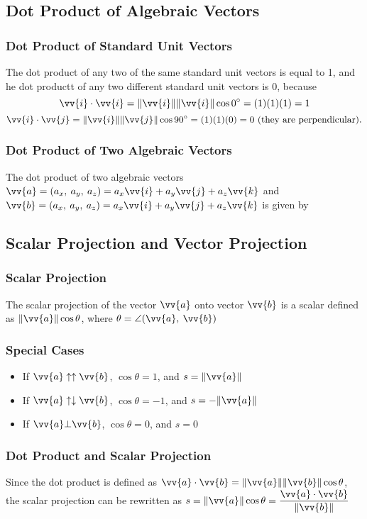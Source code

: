 \documentclass{article}
\newcommand{\mv}[1]{
	\lVert\vv{#1}\rVert
}
\begin{document}
	\subsection{Dot Product of Algebraic Vectors}
	\subsubsection{Dot Product of Standard Unit Vectors}
	The dot product of any two of the same standard unit vectors is equal to 1, and he dot productt of any two different standard unit vectors is 0, because
	\[\vv{i}\cdot\vv{i}=\mv{i}\mv{i}\cos\ang{0}=(1)(1)(1)=1\]\[\vv{i}\cdot\vv{j}=\mv{i}\mv{j}\cos\ang{90}=(1)(1)(0)=0 \text{ (they are perpendicular).}\]
	\subsubsection{Dot Product of Two Algebraic Vectors}
	The dot product of two algebraic vectors $\vv{a}=(a_x,\:a_y,\:a_z)=a_x\vv{i}+a_y\vv{j}+a_z\vv{k}$ and $\vv{b}=(a_x,\:a_y,\:a_z)=a_x\vv{i}+a_y\vv{j}+a_z\vv{k}$ is given by
	\subsection{Scalar Projection and Vector Projection}
	\subsubsection{Scalar Projection}
	The scalar projection of the vector $\vv{a}$ onto vector $\vv{b}$ is a scalar defined as $\mv{a}\cos\theta$, where $\theta=\angle(\vv{a},\:\vv{b})$
	\subsubsection{Special Cases}
	\begin{itemize}
		\item If $\vv{a}\uparrow\uparrow\vv{b}$, $\cos\theta=1$, and $s=\mv{a}$
		\item If $\vv{a}\uparrow\downarrow\vv{b}$, $\cos\theta=-1$, and $s=-\mv{a}$
		\item If $\vv{a}\bot\vv{b}$, $\cos\theta=0$, and $s=0$
	\end{itemize}
	\subsubsection{Dot Product and Scalar Projection}
	Since the dot product is defined as $\vv{a}\cdot\vv{b}=\mv{a}\mv{b}\cos\theta$, the scalar projection can be rewritten as $s=\mv{a}\cos\theta=\dfrac{\vv{a}\cdot\vv{b}}{\mv{b}}$
\end{document}
